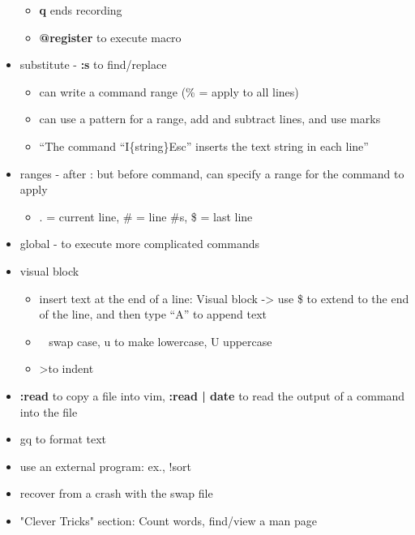 \documentclass[12pt]{article}
\begin{document}
\begin{itemize}
\begin{itemize}
            \item \textbf{q} ends recording
            \item \textbf{@{register}} to execute macro
        \end{itemize}
    \item substitute - \textbf{:s} to find/replace
        \begin{itemize}
            \item can write a command range (\% = apply to all lines)
            \item can use a pattern for a range, add and subtract lines, and use marks
            \item ``The command  ``I\{string\}Esc'' inserts the text {string} in each line'' 
        \end{itemize}
    \item ranges - after : but before command, can specify a range for the command to apply
        \begin{itemize}
            \item . = current line, \# = line \#s, \$ = last line
        \end{itemize}
    \item global - to execute more complicated commands
    \item visual block
        \begin{itemize}
            \item insert text at the end of a line: Visual block -> use \$ to extend to the end of the line, and then type ``A'' to append text
            \item ~ swap case, u to make lowercase, U uppercase
            \item \textgreater  to indent
        \end{itemize}
    \item \textbf{:read} to copy a file into vim, \textbf{:read | date} to read the output of a command into the file
    \item gq to format text
    \item use an external program: ex., !sort
    \item recover from a crash with the swap file
    \item "Clever Tricks" section: Count words, find/view a man page
\end{itemize}
\end{document}
